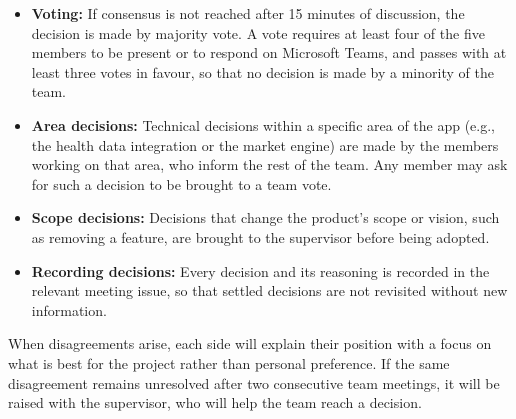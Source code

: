 \documentclass{article}
\begin{document}
\begin{itemize}
  \item \textbf{Voting:} If consensus is not reached after 15 minutes of discussion, the decision is made by majority vote. 
  A vote requires at least four of the five members to be present or to respond on Microsoft Teams, and passes with at least three votes in favour, so that no decision is made by a minority of the team.
  \item \textbf{Area decisions:} Technical decisions within a specific area of the app (e.g., the health data integration or the market engine) are made by the members working on that area, who inform the rest of the team. 
  Any member may ask for such a decision to be brought to a team vote.
  \item \textbf{Scope decisions:} Decisions that change the product's scope or vision, such as removing a feature, are brought to the supervisor before being adopted.
  \item \textbf{Recording decisions:} Every decision and its reasoning is recorded in the relevant meeting issue, so that settled decisions are not revisited without new information.
\end{itemize}

When disagreements arise, each side will explain their position with a focus on what is best for the project rather than personal preference. 
If the same disagreement remains unresolved after two consecutive team meetings, it will be raised with the supervisor, who will help the team reach a decision.
\end{document}
